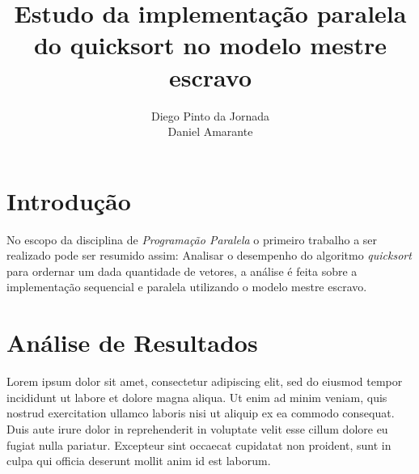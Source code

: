 \documentclass{acm_proc_article-sp}
\begin{document}
\makeatletter
\def\@copyrightspace{\relax}
\makeatother

\title{Estudo da implementação paralela do quicksort no modelo mestre escravo}

\author{
\alignauthor
Diego Pinto da Jornada\\
\alignauthor
Daniel Amarante\\
}

\maketitle




\section{Introdução}

	No escopo da disciplina de \emph{Programação Paralela} o primeiro 
	trabalho a ser realizado pode ser resumido assim: Analisar o 
	desempenho do algoritmo \emph{quicksort} para ordernar um dada 
	quantidade de vetores, a análise é feita sobre a implementação 
	sequencial e paralela utilizando o modelo mestre escravo.


\section{Análise de Resultados}

	Lorem ipsum dolor sit amet, consectetur adipiscing elit, sed do 
	eiusmod tempor incididunt ut labore et dolore magna aliqua. Ut 
	enim ad minim veniam, quis nostrud exercitation ullamco laboris 
	nisi ut aliquip ex ea commodo consequat. Duis aute irure dolor in 
	reprehenderit in voluptate velit esse cillum dolore eu fugiat 
	nulla pariatur. Excepteur sint occaecat cupidatat non proident, 
	sunt in culpa qui officia deserunt mollit anim id est laborum.
\end{document}
